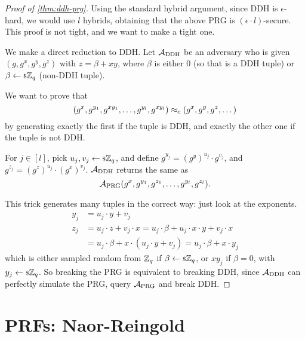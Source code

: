 \begin{proof}[Proof of \cref{thm:ddh-prg}]
	Using the standard hybrid argument, since \ac{DDH} is $\epsilon$-hard, we would use $l$ hybrids, obtaining that the above \ac{PRG} is $(\epsilon \cdot l)$-secure.
	This proof is not tight, and we want to make a tight one.

	We make a direct reduction to \ac{DDH}.
	Let $\mathcal{A}_{\text{DDH}}$ be an adversary who is given $(g, g^x, g^y, g^z)$ with $z = \beta + xy$, where $\beta$ is either $0$ (so that is a \ac{DDH} tuple) or $\beta \leftarrow {\scriptstyle \$} {\mathbb{Z}_q}$ (non-\ac{DDH} tuple).

	We want to prove that
	\begin{equation*}
		(g^{x}, g^{y_1}, g^{x y_1}, \dots, g^{y_l}, g^{x y_l})
		\approx_c
		(g^{x}, g^{y}, g^{z}, \dots)
	\end{equation*}
	by generating exactly the first if the tuple is \ac{DDH}, and exactly the other one if the tuple is not \ac{DDH}.

	For $j \in [l]$, pick $u_j, v_j \leftarrow {\scriptstyle \$} {\mathbb{Z}_q}$, and define $g^{y_j} = \left( g^{y} \right)^{u_j} \cdot g^{v_j}$, and $g^{z_j} = \left( g^z \right)^{u_j} \cdot \left(g^x\right)^{v_j}$.
	$\mathcal{A}_{\text{DDH}}$ returns the same as
	\begin{equation*}
		\mathcal{A}_{\text{PRG}}(g^x, g^{y_1}, g^{z_1}, \dots, g^{y_l}, g^{z_l}).
	\end{equation*}

	This trick generates many tuples in the correct way: just look at the exponents.
	\begin{align*}
		y_j
		& = u_j \cdot y + v_j \\
		z_j
		& = u_j \cdot z + v_j \cdot x
		= u_j \cdot \beta + u_j \cdot x \cdot y + v_j \cdot x \\
		& = u_j \cdot \beta + x \cdot (u_j \cdot y + v_j)
		= u_j \cdot \beta + x \cdot y_j
	\end{align*}
	which is either sampled random from $\mathbb{Z}_q$ if $\beta \leftarrow {\scriptstyle \$} {\mathbb{Z}_q}$, or $x y_j$ if $\beta = 0$, with $y_j \leftarrow {\scriptstyle \$} {\mathbb{Z}_q}$.
	So breaking the \ac{PRG} is equivalent to breaking \ac{DDH}, since $\mathcal{A}_{\text{DDH}}$ can perfectly simulate the \ac{PRG}, query $\mathcal{A}_{\text{PRG}}$ and break \ac{DDH}.
\end{proof}

\section{\acp{PRF}: Naor-Reingold}

